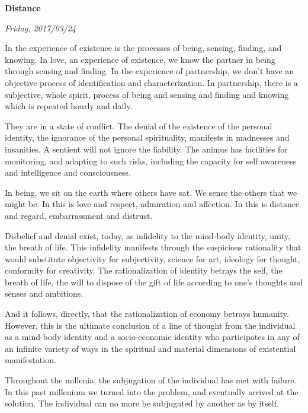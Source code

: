 

\centerline{\bf Distance}
\centerline{\it Friday, 2017/03/24}



\vfill
\break


﻿In the experience of existence is the processes of being, sensing,
finding, and knowing.  In love, an experience of existence, we know
the partner in being through sensing and finding.  In the experience
of partnership, we don’t have an objective process of identification
and characterization.  In partnership, there is a subjective, whole
spirit, process of being and sensing and finding and knowing which is
repeated hourly and daily.


\vfill
\break


﻿They are in a state of conflict.  The denial of the existence of the
personal identity, the ignorance of the personal spirituality,
manifests in madnesses and insanities.  A sentient will not ignore the
liability.  The animus has facilities for monitoring, and adapting to
such risks, including the capacity for self awareness and intelligence
and consciousness.


\vfill
\break


﻿In being, we sit on the earth where others have sat.  We sense the
others that we might be.  In this is love and respect, admiration and
affection.  In this is distance and regard, embarrassment and
distrust.


\vfill
\break


﻿Disbelief and denial exist, today, as infidelity to the mind-body
identity, unity, the breath of life.  This infidelity manifests
through the suspicious rationality that would substitute objectivity
for subjectivity, science for art, ideology for thought, conformity
for creativity.  The rationalization of identity betrays the self, the
breath of life, the will to dispose of the gift of life according to
one’s thoughts and senses and ambitions.  

And it follows, directly, that the rationalization of economy betrays
humanity.  However, this is the ultimate conclusion of a line of
thought from the individual as a mind-body identity and a
socio-economic identity who participates in any of an infinite variety
of ways in the spiritual and material dimensions of existential
manifestation.


\vfill
\break


Throughout the millenia, the subjugation of the individual has met
with failure.  In this past millenium we turned into the problem, and
eventually arrived at the solution.  The individual can no more be
subjugated by another as by itself.  


